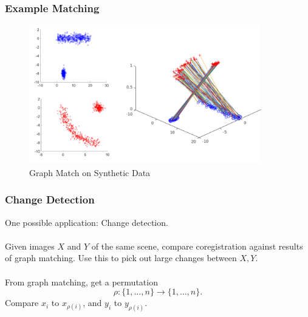 \documentclass{beamer}
\begin{document}

\begin{frame}
  \frametitle{Example Matching}
  \begin{figure}
    \centering
    \includegraphics[width = 0.9\textwidth]{./Images/GraphMatch/CombinePic/combinepic.png}
    \caption{Graph Match on Synthetic Data}
  \end{figure}
\end{frame}


\begin{frame}
  \frametitle{Change Detection}
  One possible application: Change detection. \\~\\
  Given images $X$ and $Y$ of the same scene, compare coregistration against results of graph matching. Use this to pick out large changes between $X, Y$.\\~\\
  From graph matching, get a permutation
  \[\rho: \{1,\ldots,n\} \to \{1,\ldots,n\}.\]
  Compare $x_i$ to $x_{\rho(i)}$, and $y_i$ to $y_{\rho(i)}$. \\~\\
\end{frame}


\end{document}
